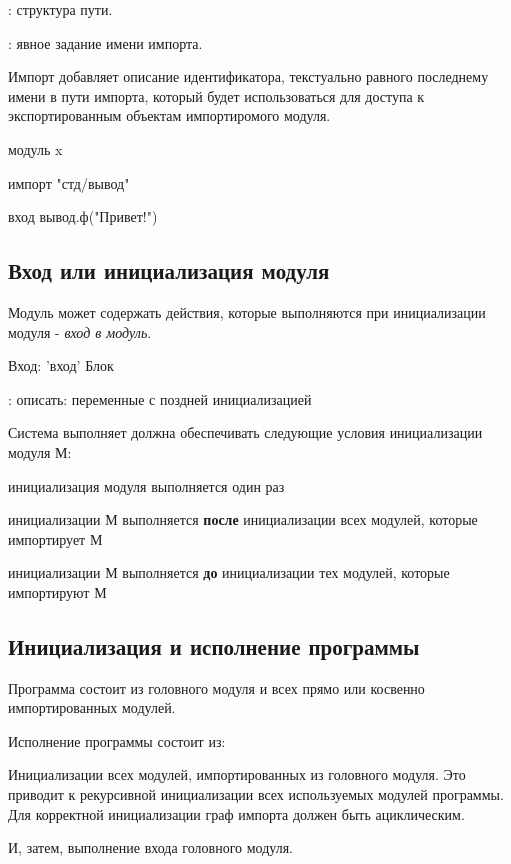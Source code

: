 \TBD: структура пути.

\TBD: явное задание имени импорта.

\bigskip
Импорт добавляет описание идентификатора, текстуально равного последнему имени в пути импорта, который будет использоваться для доступа к экспортированным объектам импортиромого модуля. 

\begin{Trivil}
модуль x

импорт "стд/вывод"

вход {
    вывод.ф("Привет!")
}
\end{Trivil}



\hypertarget{entry}{%
\subsection{Вход или инициализация модуля}\label{mods:entry}}

Модуль может содержать действия, которые выполняются при инициализации модуля - \emph{вход в модуль}. 

\begin{Trivil}
Вход: 'вход' Блок
\end{Trivil}

\TBD: описать: переменные с поздней инициализацией
\bigskip

Система выполняет должна обеспечивать следующие условия инициализации модуля М:
\begin{d_itemize}
\item
    инициализация модуля выполняется один раз
\item
    инициализации М выполняется \textbf{после} инициализации всех модулей, которые импортирует М
\item
    инициализации М выполняется \textbf{до} инициализации тех модулей, которые импортируют М
\end{d_itemize}

\hypertarget{execution}{%
\subsection{Инициализация и исполнение программы}\label{mods:execution}}

Программа состоит из головного модуля и всех прямо или косвенно импортированных модулей.

Исполнение программы состоит из:
\begin{d_itemize}
\item
    Инициализации всех модулей, импортированных из головного модуля. Это приводит к рекурсивной инициализации всех используемых модулей
    программы. Для корректной инициализации граф импорта должен быть ациклическим.
\item
    И, затем, выполнение входа головного модуля.
\end{d_itemize}

